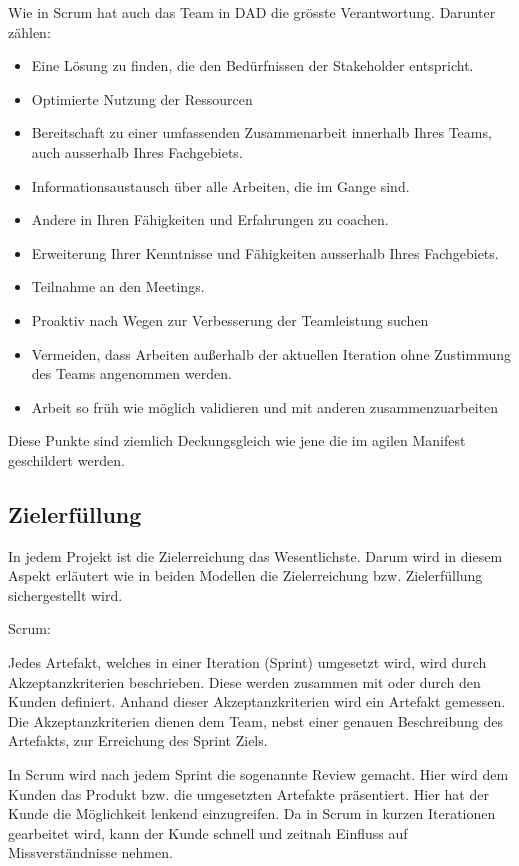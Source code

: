 Wie in Scrum hat auch das Team in DAD die grösste Verantwortung. Darunter zählen:

\begin{itemize}
	\item Eine Lösung zu finden, die den Bedürfnissen der Stakeholder entspricht.
	\item Optimierte Nutzung der Ressourcen
	\item Bereitschaft zu einer umfassenden Zusammenarbeit innerhalb Ihres Teams, auch ausserhalb Ihres Fachgebiets.
	\item Informationsaustausch über alle Arbeiten, die im Gange sind.
	\item Andere in Ihren Fähigkeiten und Erfahrungen zu coachen.
	\item Erweiterung Ihrer Kenntnisse und Fähigkeiten ausserhalb Ihres Fachgebiets.
	\item Teilnahme an den Meetings.
	\item Proaktiv nach Wegen zur Verbesserung der Teamleistung suchen
	\item Vermeiden, dass Arbeiten außerhalb der aktuellen Iteration ohne Zustimmung des Teams angenommen werden.
	\item Arbeit so früh wie möglich validieren und mit anderen zusammenzuarbeiten
\end{itemize}

Diese Punkte sind ziemlich Deckungsgleich wie jene die im agilen Manifest geschildert werden. 

\subsection{Zielerfüllung}

In jedem Projekt ist die Zielerreichung das Wesentlichste. Darum wird in diesem Aspekt erläutert wie in beiden Modellen die Zielerreichung bzw. Zielerfüllung sichergestellt wird.

\medskip
{\Large Scrum:} \medskip

Jedes Artefakt, welches in einer Iteration (Sprint) umgesetzt wird, wird durch Akzeptanzkriterien beschrieben. Diese werden zusammen mit oder durch den Kunden definiert. Anhand dieser Akzeptanzkriterien wird ein Artefakt gemessen. Die Akzeptanzkriterien dienen dem Team, nebst einer genauen Beschreibung des Artefakts, zur Erreichung des Sprint Ziels.

In Scrum wird nach jedem Sprint die sogenannte Review gemacht. Hier wird dem Kunden das Produkt bzw. die umgesetzten Artefakte präsentiert. Hier hat der Kunde die Möglichkeit lenkend einzugreifen. Da in Scrum in kurzen Iterationen gearbeitet wird, kann der Kunde schnell und zeitnah Einfluss auf Missverständnisse nehmen.

